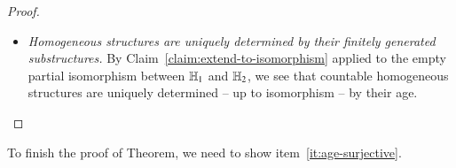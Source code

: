 \begin{proof}
\begin{itemize}
\begin{proof}
				\begin{itemize}
					\item[(**)] For every isomorphism between structures in the ages of $\structh_1$ and $\structh_2$, respectively, and every element $a$ of either $\structh_1$ or $\structh_2$, the partial isomorphism can be extended to be defined also on $a$.
				\end{itemize}


				The conclusion of the claim follows from (**) using a back-and-forth construction. Define inductively a sequence of partial isomorphisms between finitely generated substructures of $\structh_1$ and $\structh_2$, such that the next one extends the previous one, and every element of both structures appears eventually in the source or target of a partial isomorphism from the sequence. The full isomorphism is then the limit of these partial isomorphisms.
		\end{proof}
			\item \emph{Homogeneous structures are uniquely determined by their finitely generated substructures.} By Claim~\ref{claim:extend-to-isomorphism} applied to the empty partial isomorphism between $\structh_1$ and $\structh_2$, we see that countable homogeneous structures are uniquely determined -- up to isomorphism -- by their age. 
\end{itemize}
\end{proof}


To finish the proof of \fraisse Theorem, we need to show item~\ref{it:age-surjective}.


